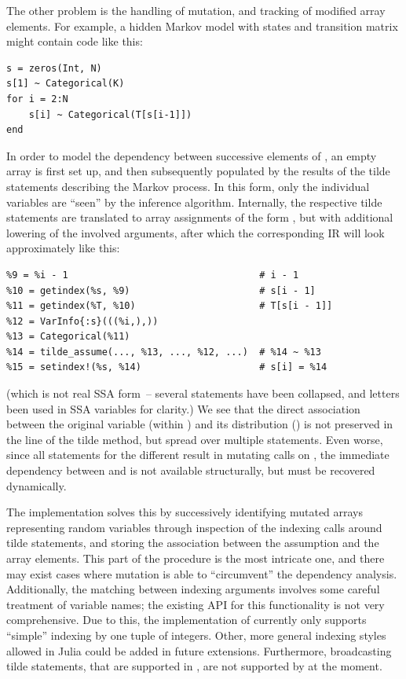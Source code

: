The other problem is the handling of mutation, and tracking of modified array elements.  For
example, a hidden Markov model with states  and transition matrix  might contain
code like this:
\begin{lstlisting}
s = zeros(Int, N)
s[1] ~ Categorical(K)
for i = 2:N
    s[i] ~ Categorical(T[s[i-1]])
end
\end{lstlisting}
In order to model the dependency between successive elements of , an empty array is first
set up, and then subsequently populated by the results of the tilde statements describing the Markov
process.  In this form, only the individual variables  are \enquote{seen} by the
inference algorithm.  Internally, the respective tilde statements are translated to array
assignments of the form , but with additional lowering of the
involved arguments, after which the corresponding IR will look approximately like this:
\begin{lstlisting}
%9 = %i - 1                                  # i - 1
%10 = getindex(%s, %9)                       # s[i - 1]
%11 = getindex(%T, %10)                      # T[s[i - 1]]
%12 = VarInfo{:s}(((%i,),))
%13 = Categorical(%11)
%14 = tilde_assume(..., %13, ..., %12, ...)  # %14 ~ %13
%15 = setindex!(%s, %14)                     # s[i] = %14
\end{lstlisting}
(which is not real SSA form~-- several statements have been collapsed, and letters been used in SSA
variables for clarity.)  We see that the direct association between the original variable
 (within ) and its distribution () is not preserved in the line
of the tilde method, but spread over multiple statements.  Even worse, since all statements for the
different  result in mutating  calls on , the immediate
dependency between  and  is not available structurally, but must be
recovered dynamically.

The  implementation solves this by successively identifying mutated arrays
representing random variables through inspection of the indexing calls around tilde statements, and
storing the association between the assumption and the array elements.  This part of the procedure
is the most intricate one, and there may exist cases where mutation is able to \enquote{circumvent}
the dependency analysis.  Additionally, the matching between indexing arguments involves some
careful treatment of variable names; the existing \dppljl{} API for this functionality is not very
comprehensive.  Due to this, the implementation of \autogibbsjl{} currently only supports
\enquote{simple} indexing by one tuple of integers.  Other, more general indexing styles allowed in
Julia could be added in future extensions.  Furthermore, broadcasting tilde statements, that are
supported in \dppljl{}, are not supported by \autogibbsjl{} at the moment.

